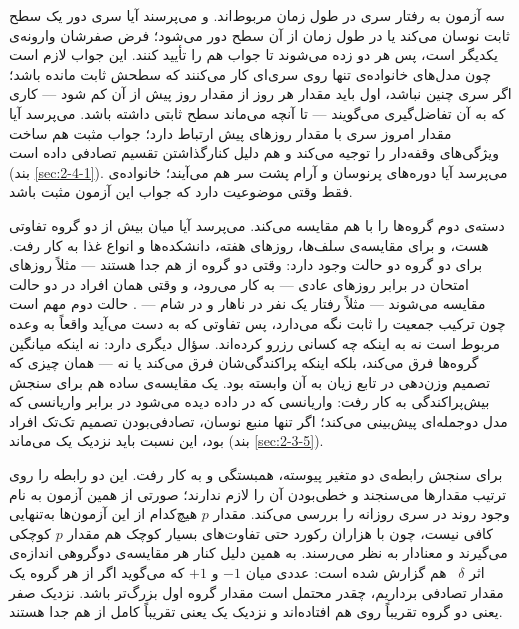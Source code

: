 سه آزمون به رفتار سری در طول زمان مربوط‌اند.  و  می‌پرسند آیا سری دور یک
سطح ثابت نوسان می‌کند یا در طول زمان از آن سطح دور می‌شود؛ فرض صفرشان وارونه‌ی یکدیگر
است، پس هر دو زده می‌شوند تا جواب هم را تأیید کنند. این جواب لازم است چون مدل‌های
خانواده‌ی  تنها روی سری‌ای کار می‌کنند که سطحش ثابت مانده باشد؛ اگر سری چنین
نباشد، اول باید مقدار هر روز از مقدار روز پیش از آن کم شود — کاری که به آن تفاضل‌گیری
می‌گویند — تا آنچه می‌ماند سطح ثابتی داشته باشد.  می‌پرسد آیا مقدار امروز سری با مقدار
روزهای پیش ارتباط دارد؛ جواب مثبت هم ساخت ویژگی‌های وقفه‌دار را توجیه می‌کند و هم دلیل
کنارگذاشتن تقسیم تصادفی داده است (بند \ref{sec:2-4-1}).  می‌پرسد آیا
دوره‌های پرنوسان و آرام پشت سر هم می‌آیند؛ خانواده‌ی  فقط وقتی موضوعیت دارد که
جواب این آزمون مثبت باشد.

دسته‌ی دوم گروه‌ها را با هم مقایسه می‌کند.  می‌پرسد آیا میان بیش از دو
گروه تفاوتی هست، و برای مقایسه‌ی سلف‌ها، روزهای هفته، دانشکده‌ها و انواع غذا به کار رفت.
برای دو گروه دو حالت وجود دارد: وقتی دو گروه از هم جدا هستند — مثلاً روزهای امتحان در
برابر روزهای عادی —  به کار می‌رود، و وقتی همان افراد در دو حالت
مقایسه می‌شوند — مثلاً رفتار یک نفر در ناهار و در شام — . حالت دوم مهم است
چون ترکیب جمعیت را ثابت نگه می‌دارد، پس تفاوتی که به دست می‌آید واقعاً به وعده مربوط است
نه به اینکه چه کسانی رزرو کرده‌اند.  سؤال دیگری دارد: نه اینکه میانگین گروه‌ها
فرق می‌کند، بلکه اینکه پراکندگی‌شان فرق می‌کند یا نه — همان چیزی که تصمیم وزن‌دهی در تابع
زیان به آن وابسته بود. یک مقایسه‌ی ساده هم برای سنجش بیش‌پراکندگی به کار رفت: واریانسی که
در داده دیده می‌شود در برابر واریانسی که مدل دوجمله‌ای پیش‌بینی می‌کند؛ اگر تنها منبع
نوسان، تصادفی‌بودن تصمیم تک‌تک افراد بود، این نسبت باید نزدیک یک می‌ماند (بند
\ref{sec:2-3-5}).

برای سنجش رابطه‌ی دو متغیر پیوسته، همبستگی  و  به کار رفت. این
دو رابطه را روی ترتیب مقدارها می‌سنجند و خطی‌بودن آن را لازم ندارند؛ صورتی از همین آزمون
به نام  وجود روند در سری روزانه را بررسی می‌کند. مقدار $p$ هیچ‌کدام از
این آزمون‌ها به‌تنهایی کافی نیست، چون با هزاران رکورد حتی تفاوت‌های بسیار کوچک هم مقدار
$p$ کوچکی می‌گیرند و معنادار به نظر می‌رسند. به همین دلیل کنار هر مقایسه‌ی دوگروهی اندازه‌ی
اثر  $\delta$~\cite{Cliff93dominance} هم گزارش شده است: عددی میان $-1$ و
$+1$ که می‌گوید اگر از هر گروه یک مقدار تصادفی برداریم، چقدر محتمل است مقدار گروه اول
بزرگ‌تر باشد. نزدیک صفر یعنی دو گروه تقریباً روی هم افتاده‌اند و نزدیک یک یعنی تقریباً
کامل از هم جدا هستند.

